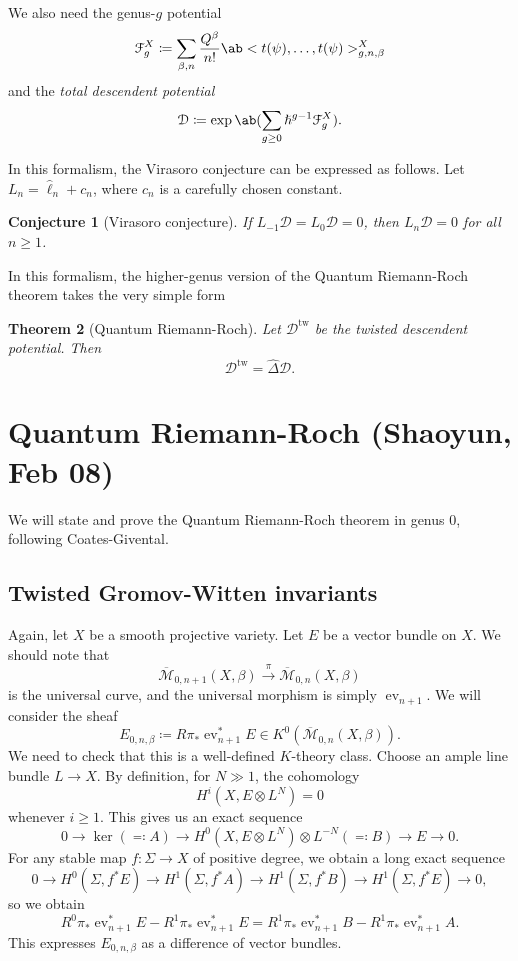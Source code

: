 \documentclass[leqno, openany]{memoir}
\newtheorem{thm}{Theorem}[section]
\newtheorem{conj}[thm]{Conjecture}
\theoremstyle{definition}
\theoremstyle{remark}
\theoremstyle{plain}
\theoremstyle{definition}
\theoremstyle{remark}
\newcommand{\mc}[1]{\mathcal{#1}}
\newcommand{\mr}[1]{\mathrm{#1}}
\newcommand{\on}[1]{\operatorname{#1}}
\newcommand{\wh}[1]{\widehat{#1}}
\newcommand{\Mbar}{\overline{\mathcal{M}}}
\DeclareMathOperator{\ev}{ev}
\begin{document}
We also need the genus-$g$ potential
\[ \mc{F}_g^X \coloneqq \sum_{\beta, n} \frac{Q^{\beta}}{n!} \ab<t(\psi), \ldots, t(\psi)>_{g,n,\beta}^X \]
and the \textit{total descendent potential}
\[ \mc{D} \coloneqq \exp\ab(\sum_{g \geq 0} \hslash^{g-1} \mc{F}_g^X). \]

In this formalism, the Virasoro conjecture can be expressed as follows. Let $L_n = \wh{\ell}_n + c_n$, where $c_n$ is a carefully chosen constant.

\begin{conj}[Virasoro conjecture]
    If $L_{-1} \mc{D} = L_0 \mc{D} = 0$, then $L_n \mc{D} = 0$ for all $n \geq 1$.
\end{conj}

In this formalism, the higher-genus version of the Quantum Riemann-Roch theorem takes the very simple form
\begin{thm}[Quantum Riemann-Roch]
    Let $\mc{D}^{\mr{tw}}$ be the twisted descendent potential. Then
    \[ \mc{D}^{\mr{tw}} = \wh{\Delta} \mc{D}. \]
\end{thm}

\section{Quantum Riemann-Roch (Shaoyun, Feb 08)}
\label{sec:qrr}

We will state and prove the Quantum Riemann-Roch theorem in genus $0$, following Coates-Givental.

\subsection{Twisted Gromov-Witten invariants}

Again, let $X$ be a smooth projective variety. Let $E$ be a vector bundle on $X$. We should note that 
\[ \Mbar_{0,n+1}(X,\beta) \xrightarrow{\pi} \Mbar_{0,n}(X,\beta) \]
is the universal curve, and the universal morphism is simply $\on{ev}_{n+1}$. We will consider the sheaf
\[ E_{0,n,\beta} \coloneqq R\pi_* \on{ev}_{n+1}^* E \in K^0(\Mbar_{0,n}(X, \beta)). \]
We need to check that this is a well-defined $K$-theory class. Choose an ample line bundle $L \to X$. By definition, for $N \gg 1$, the cohomology
\[ H^i(X, E \otimes L^N) = 0 \]
whenever $i \geq 1$. This gives us an exact sequence
\[ 0 \to \ker ( \eqqcolon A ) \to H^0(X, E \otimes L^N) \otimes L^{-N} ( \eqqcolon B ) \to E \to 0. \]
For any stable map $f \colon \Sigma \to X$ of positive degree, we obtain a long exact sequence
\begin{equation*}
    0 \to H^0(\Sigma, f^* E) \to H^1(\Sigma, f^* A) \to H^1(\Sigma, f^* B) \to H^1(\Sigma, f^* E) \to 0,
\end{equation*}
so we obtain
\[ R^0 \pi_* \ev_{n+1}^* E - R^1 \pi_* \ev_{n+1}^* E = R^1 \pi_* \ev_{n+1}^* B - R^1 \pi_* \ev_{n+1}^* A. \]
This expresses $E_{0,n,\beta}$ as a difference of vector bundles.
\end{document}
